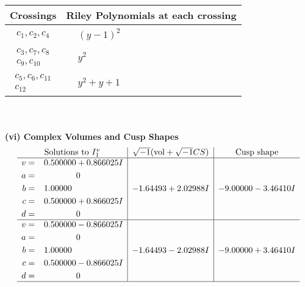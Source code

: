 \documentclass[1p]{elsarticle_modified}
\theoremstyle{definition}
\newcommand{\I}{\sqrt{-1}}
\begin{document}
\begin{tabular}{m{50pt}|m{274pt}}
Crossings & \hspace{64pt}Riley Polynomials at each crossing \\
\hline $$\begin{aligned}c_{1},c_{2},c_{4}\end{aligned}$$&$\begin{aligned}
&(y-1)^2
\end{aligned}$\\
\hline $$\begin{aligned}c_{3},c_{7},c_{8}\\c_{9},c_{10}\end{aligned}$$&$\begin{aligned}
&y^2
\end{aligned}$\\
\hline $$\begin{aligned}c_{5},c_{6},c_{11}\\c_{12}\end{aligned}$$&$\begin{aligned}
&y^2+y+1
\end{aligned}$\\
\hline
\end{tabular}\\~\\
\newpage\flushleft \textbf{(vi) Complex Volumes and Cusp Shapes}
$$\begin{array}{c|c|c}  
\text{Solutions to }I^v_{1}& \I (\text{vol} + \sqrt{-1}CS) & \text{Cusp shape}\\
 \hline 
\begin{aligned}
v &= \phantom{-}0.500000 + 0.866025 I \\
a &= \phantom{-0.000000 } 0 \\
b &= \phantom{-}1.00000\phantom{ +0.000000I} \\
c &= \phantom{-}0.500000 + 0.866025 I \\
d &= \phantom{-0.000000 } 0\end{aligned}
 & -1.64493 + 2.02988 I & -9.00000 - 3.46410 I \\ \hline\begin{aligned}
v &= \phantom{-}0.500000 - 0.866025 I \\
a &= \phantom{-0.000000 } 0 \\
b &= \phantom{-}1.00000\phantom{ +0.000000I} \\
c &= \phantom{-}0.500000 - 0.866025 I \\
d &= \phantom{-0.000000 } 0\end{aligned}
 & -1.64493 - 2.02988 I & -9.00000 + 3.46410 I\\
 \hline 
 \end{array}$$\newpage\newpage\renewcommand{\arraystretch}{1}
\end{document}
